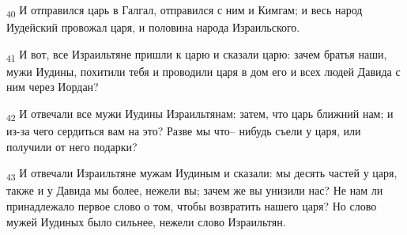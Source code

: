 \begin{tcolorbox}
\textsubscript{40} И отправился царь в Галгал, отправился с ним и Кимгам; и весь народ Иудейский провожал царя, и половина народа Израильского.
\end{tcolorbox}
\begin{tcolorbox}
\textsubscript{41} И вот, все Израильтяне пришли к царю и сказали царю: зачем братья наши, мужи Иудины, похитили тебя и проводили царя в дом его и всех людей Давида с ним через Иордан?
\end{tcolorbox}
\begin{tcolorbox}
\textsubscript{42} И отвечали все мужи Иудины Израильтянам: затем, что царь ближний нам; и из-за чего сердиться вам на это? Разве мы что-- нибудь съели у царя, или получили от него подарки?
\end{tcolorbox}
\begin{tcolorbox}
\textsubscript{43} И отвечали Израильтяне мужам Иудиным и сказали: мы десять частей у царя, также и у Давида мы более, нежели вы; зачем же вы унизили нас? Не нам ли принадлежало первое слово о том, чтобы возвратить нашего царя? Но слово мужей Иудиных было сильнее, нежели слово Израильтян.
\end{tcolorbox}
